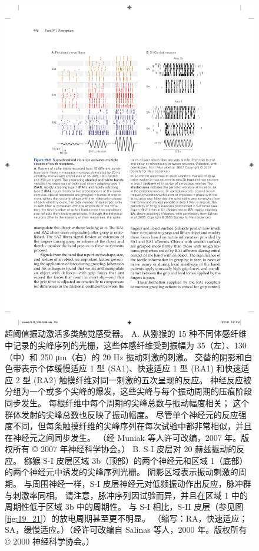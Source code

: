 \begin{figure}[htbp]
	\centering
	\includegraphics[width=1.0\linewidth]{chap19/fig_19_9}
	\caption{超阈值振动激活多类触觉感受器。 
		A. 从猕猴的 15 种不同体感纤维中记录的尖峰序列的光栅，这些体感纤维受到振幅为 35（左）、130（中）和 250 μm（右）的 20 Hz 振动刺激的刺激。 
		交替的阴影和白色带表示个体缓慢适应 1 型 (SA1)、快速适应 1 型 (RA1) 和快速适应 2 型 (RA2) 触摸纤维对同一刺激的五次呈现的反应。 
		神经反应被分组为一个或多个尖峰的爆发，这些尖峰与每个振动周期的压痕阶段同步发生。 
		每根纤维中每个周期的尖峰总数与振动幅度相关； 这个群体发射的尖峰总数也反映了振动幅度。 
		尽管单个神经元的反应强度不同，但每条触摸纤维的尖峰序列在每次试验中都非常相似，并且在神经元之间同步发生。 （经 Muniak 等人许可改编，2007 年。版权所有 © 2007 年神经科学协会。）
		B. S-I 皮层对 20 赫兹振动的反应。 猕猴 S-I 皮层区域 3b（顶部）的两个神经元和区域 1（底部）的两个神经元中诱发的尖峰序列光栅。 
		阴影区域表示振动刺激的周期。 
		与周围神经一样，S-I 皮层神经元对低频振动作出反应，脉冲群与刺激率同相。 
		请注意，脉冲序列因试验而异，并且在区域 1 中的周期性低于区域 3b 中的周期性。 
		与 S-I 相比，S-II 皮层（参见图 \ref{fig:19_21}）的放电周期甚至更不明显。 （缩写：RA，快速适应；SA，缓慢适应。）（经许可改编自 Salinas 等人，2000 年。版权所有 © 2000 神经科学协会。）}
	\label{fig:19_9}
\end{figure}

